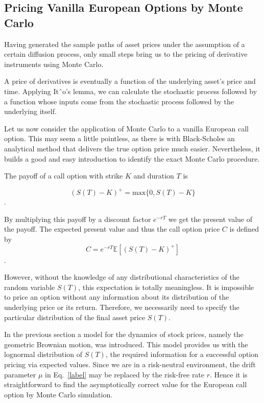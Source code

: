 \subsection{Pricing Vanilla European Options by Monte Carlo}
Having generated the sample paths of asset prices under the assumption of a 
certain diffusion process, only small steps bring us to the pricing of
derivative instruments using Monte Carlo. 

A price of derivatives is eventually 
a function of the underlying asset's price and time. Applying Itˆo's
lemma, we can calculate the stochastic process followed by a function
whose inputs come from the stochastic process followed by the underlying
itself.

Let us now consider the application of Monte Carlo to a
vanilla European call option. This may seem a little pointless, as there
is with Black-Scholes an analytical method that delivers the
true option price much easier. Nevertheless, it builds a good and easy
introduction to identify the exact Monte Carlo procedure. 

The payoff of a call option with strike $K$ and duration $T$ is 

\begin{equation}
(S(T)−K)^+ = \textrm{max}\{0,S(T)−K\}
\end{equation}. 

By multiplying this payoff by a discount factor $e^{−rT}$ we get 
the present value of the payoff. 
The expected present value and thus the call option price $C$ is defined 
by
\begin{equation} 
C = e^{−rT} \mathbb{E}[(S(T) −K)^+ ]
\end{equation}. 

However, without the knowledge of any distributional
characteristics of the random variable $S(T)$, this expectation is totally
meaningless. It is impossible to price an option without any information
about its distribution of the underlying price or its return. Therefore,
we necessarily need to specify the particular distribution of the final
asset price $S(T)$. 

In the previous section a model for the dynamics of
stock prices, namely the geometric Brownian motion, was introduced. This
model provides us with the lognormal distribution of $S(T)$, the required
information for a successful option pricing via expected values. Since
we are in a risk-neutral environment, the drift parameter $\mu$ in Eq.~\ref{label}
may be replaced by the risk-free rate $r$. Hence it is
straightforward to find the asymptotically correct value for the
European call option by Monte Carlo simulation. 

